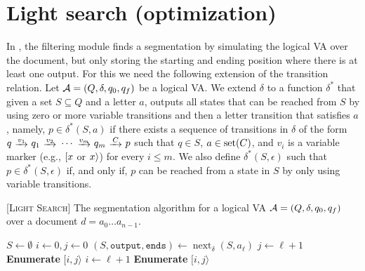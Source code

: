 
\section{Light search (optimization)}

In \rematch, the filtering module finds a segmentation by simulating the logical
VA over the document, but only storing the starting and ending position where
there is at least one output. For this we need the following extension of the
transition relation. Let $\mathcal{A} = (Q, \delta, q_0, q_f)$ be a logical VA. We
extend $\delta$ to a function $\delta^*$ that given a set $S \subseteq Q$ and a
letter $a$, outputs all states that can be reached from $S$ by using zero or
more variable transitions and then a letter transition that satisfies $a$,
namely, $p \in \delta^*(S,a)$ if there exists a sequence of transitions in
$\delta$ of the form
$
	q \ \trans{v_1} \ q_1 \ \trans{v_2} \ \cdots \ \trans{v_m} \ q_m \ \trans{C} \ p
$
such that $q \in S$, $a \in \operatorname{set}(C)$, and $v_i$ is a variable marker (e.g.,
$[ x$ or $x \rangle$) for every $i \leq m$. We also define
$\delta^*(S,\epsilon)$ such that $p \in \delta^*(S,\epsilon)$ if, and only if,
$p$ can be reached from a state in $S$ by only using variable transitions.

\newcommand{\foutput}{\texttt{output}} \newcommand{\fends}{\texttt{ends}}
\newcommand{\fnext}{\operatorname{next}_{\delta}}



\begin{algorithm}[t]
	\caption{[\textsc{Light Search}] The segmentation algorithm for a logical VA
	$\mathcal{A} = (Q, \delta, q_0, q_f)$ over a document $d = a_0 \ldots
	a_{n-1}$.}\label{alg:segmentation}
	\begin{algorithmic}[1]
		 \State $S \gets
		\emptyset$ \State $i \gets 0, j \gets 0$ 
		\State $(S, \foutput, \fends) \gets \fnext(S, a_\ell)$ \If{$\foutput$}
		\State $j \gets \ell+1$ \ElsIf{$\fends$}  \State
		\textbf{Enumerate} $[i, j\rangle$ \EndIf \State $i \gets \ell + 1$
		\EndIf \EndFor {} \State \textbf{Enumerate} $[i, j\rangle$
		\EndIf \EndProcedure
	\end{algorithmic}
\end{algorithm}

